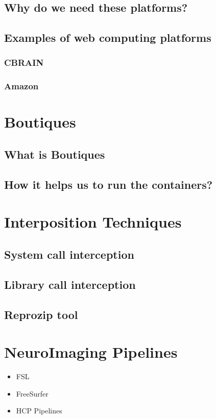 \subsection{Why do we need these platforms?}
\subsection{Examples of web computing platforms}
\subsubsection{CBRAIN}
\subsubsection{Amazon}

\section{Boutiques}
\subsection{What is Boutiques}
\subsection{How it helps us to run the containers?}

\section{Interposition Techniques}
\subsection{System call interception}
\subsection{Library call interception}
\subsection{Reprozip tool}

\section{NeuroImaging Pipelines}
\begin{itemize}
 \item FSL
 \item FreeSurfer
 \item HCP Pipelines
\end{itemize}

